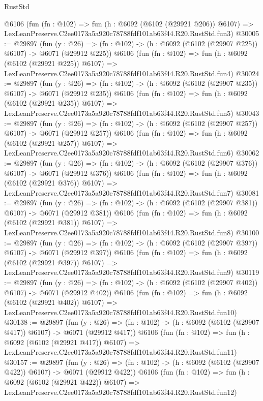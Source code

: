 \begin{lexlean}{RustStd}
\begin{coremodule}
    @6106
    (fun (fn : @102) =>
    fun (h : @6092 (@6102 (@29921 @206)) @6107) =>
    LexLeanPreserve.C2ee0173a5a920c78788fdf101ab63f44.R20.RustStd.fun3)
@30005 := @29897
    (fun (y : @26) => (fn : @102) -> (h : @6092 (@6102 (@29907 @225)) @6107) -> @6071 (@29912 @225))
    @6106
    (fun (fn : @102) =>
    fun (h : @6092 (@6102 (@29921 @225)) @6107) =>
    LexLeanPreserve.C2ee0173a5a920c78788fdf101ab63f44.R20.RustStd.fun4)
@30024 := @29897
    (fun (y : @26) => (fn : @102) -> (h : @6092 (@6102 (@29907 @235)) @6107) -> @6071 (@29912 @235))
    @6106
    (fun (fn : @102) =>
    fun (h : @6092 (@6102 (@29921 @235)) @6107) =>
    LexLeanPreserve.C2ee0173a5a920c78788fdf101ab63f44.R20.RustStd.fun5)
@30043 := @29897
    (fun (y : @26) => (fn : @102) -> (h : @6092 (@6102 (@29907 @257)) @6107) -> @6071 (@29912 @257))
    @6106
    (fun (fn : @102) =>
    fun (h : @6092 (@6102 (@29921 @257)) @6107) =>
    LexLeanPreserve.C2ee0173a5a920c78788fdf101ab63f44.R20.RustStd.fun6)
@30062 := @29897
    (fun (y : @26) => (fn : @102) -> (h : @6092 (@6102 (@29907 @376)) @6107) -> @6071 (@29912 @376))
    @6106
    (fun (fn : @102) =>
    fun (h : @6092 (@6102 (@29921 @376)) @6107) =>
    LexLeanPreserve.C2ee0173a5a920c78788fdf101ab63f44.R20.RustStd.fun7)
@30081 := @29897
    (fun (y : @26) => (fn : @102) -> (h : @6092 (@6102 (@29907 @381)) @6107) -> @6071 (@29912 @381))
    @6106
    (fun (fn : @102) =>
    fun (h : @6092 (@6102 (@29921 @381)) @6107) =>
    LexLeanPreserve.C2ee0173a5a920c78788fdf101ab63f44.R20.RustStd.fun8)
@30100 := @29897
    (fun (y : @26) => (fn : @102) -> (h : @6092 (@6102 (@29907 @397)) @6107) -> @6071 (@29912 @397))
    @6106
    (fun (fn : @102) =>
    fun (h : @6092 (@6102 (@29921 @397)) @6107) =>
    LexLeanPreserve.C2ee0173a5a920c78788fdf101ab63f44.R20.RustStd.fun9)
@30119 := @29897
    (fun (y : @26) => (fn : @102) -> (h : @6092 (@6102 (@29907 @402)) @6107) -> @6071 (@29912 @402))
    @6106
    (fun (fn : @102) =>
    fun (h : @6092 (@6102 (@29921 @402)) @6107) =>
    LexLeanPreserve.C2ee0173a5a920c78788fdf101ab63f44.R20.RustStd.fun10)
@30138 := @29897
    (fun (y : @26) => (fn : @102) -> (h : @6092 (@6102 (@29907 @417)) @6107) -> @6071 (@29912 @417))
    @6106
    (fun (fn : @102) =>
    fun (h : @6092 (@6102 (@29921 @417)) @6107) =>
    LexLeanPreserve.C2ee0173a5a920c78788fdf101ab63f44.R20.RustStd.fun11)
@30157 := @29897
    (fun (y : @26) => (fn : @102) -> (h : @6092 (@6102 (@29907 @422)) @6107) -> @6071 (@29912 @422))
    @6106
    (fun (fn : @102) =>
    fun (h : @6092 (@6102 (@29921 @422)) @6107) =>
    LexLeanPreserve.C2ee0173a5a920c78788fdf101ab63f44.R20.RustStd.fun12)

\end{coremodule}
\end{lexlean}
